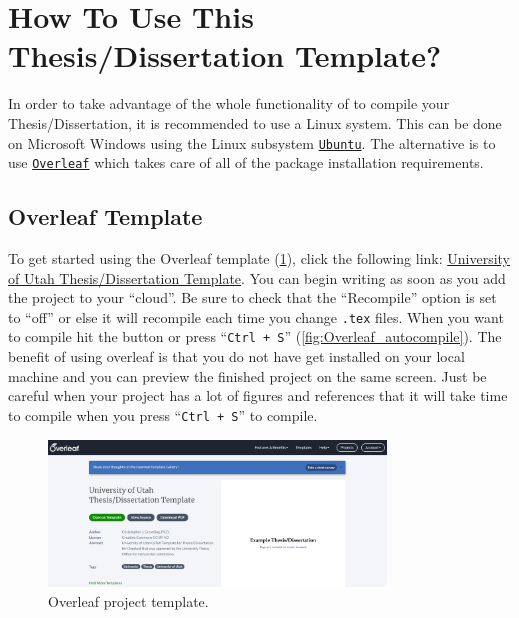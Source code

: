 \documentclass[../Dissertation]{subfiles}
\begin{document}
\section{How To Use This Thesis/Dissertation  Template?}
    In order to take advantage of the whole functionality of  to
    compile your Thesis/Dissertation, it is recommended to use a Linux system.
    This can be done on Microsoft Windows using the Linux subsystem
    \href{https://ubuntu.com/}{\texttt{Ubuntu}}.  The alternative is to use
    \href{https://www.overleaf.com/}{\texttt{Overleaf}} which takes care of all
    of the package installation requirements.  

\subsection{Overleaf Template}
    To get started using the Overleaf template (\cref{fig:Overleaf}), click the
    following link:
    \href{https://www.overleaf.com/latex/templates/university-of-utah-thesis-slash-dissertation-template/cvsmnmqjwtck}{University
    of Utah Thesis/Dissertation Template}.  You can begin writing as soon as
    you add the project to your ``cloud''.  Be sure to check that the
    ``Recompile'' option is set to ``off'' or else it will recompile each time
    you change \texttt{.tex} files.  When you want to compile hit the button or
    press ``\texttt{Ctrl + S}'' (\cref{fig:Overleaf_autocompile}).  The benefit
    of using overleaf is that you do not have get  installed on
    your local machine and you can preview the finished project on the same
    screen.  Just be careful when your project has a lot of figures and
    references that it will take time to compile when you press ``\texttt{Ctrl
    + S}'' to compile.  
    
    \begin{figure}[H]
        \centering
        \includegraphics[width=0.8\textwidth]
        {./Overleaf}
        \caption{Overleaf project template.}
        \label{fig:Overleaf}
    \end{figure}
    
\end{document}
